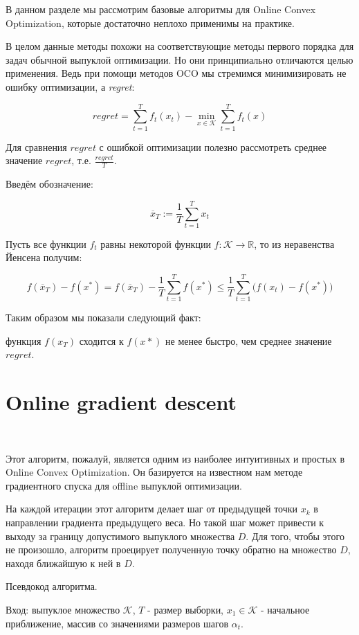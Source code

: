 \documentclass[12pt]{article}
\theoremstyle{definition}
\begin{document}
В данном разделе мы рассмотрим базовые алгоритмы для Online Convex Optimization, которые достаточно неплохо применимы на практике.

В целом данные методы похожи на соответствующие методы первого порядка для задач обычной выпуклой оптимизации. Но они принципиально отличаются целью применения. Ведь при помощи методов OCO мы стремимся минимизировать не ошибку оптимизации, а \textit{regret}:

$$regret = \sum\limits_{t=1}^T f_t(x_t) - \min\limits_{x \in \mathcal{K}} \sum\limits_{t=1}^T f_t(x)$$

Для сравнения $regret$ с ошибкой оптимизации полезно рассмотреть среднее значение $regret$, т.е. $\frac{regret}{T}$.

Введём обозначение:

$$\overline{x}_T := \frac{1}{T}\sum\limits_{t=1}^T x_t$$

Пусть все функции $f_t$ равны некоторой функции $f : \mathcal{K} \rightarrow \mathbb{R}$, то из неравенства Йенсена получим:

$$f(\overline{x}_T)-f(x^*) = f(\overline{x}_T)- \frac{1}{T} \sum\limits_{t=1}^T f(x^*) \leq \frac{1}{T}\sum\limits_{t=1}^T \big(f(x_t)-   f(x^*)\big	)$$

Таким образом мы показали следующий факт: 

функция $f(x_T)$ сходится к $f(x*)$ не менее быстро, чем среднее значение $regret$.

\section*{Online gradient descent}
$ $

Этот алгоритм, пожалуй, является одним из наиболее интуитивных и простых в Online Convex Optimization. Он базируется на известном нам методе градиентного спуска для offline выпуклой оптимизации.

На каждой итерации этот алгоритм делает шаг от предыдущей точки $x_k$ в направлении градиента предыдущего веса. Но такой шаг может привести к выходу за границу допустимого выпуклого множества $D$. Для того, чтобы этого не произошло, алгоритм проецирует полученную точку обратно на множество $D$, находя ближайшую к ней в $D$.

Псевдокод алгоритма.

Вход: выпуклое множество $\mathcal{K}$, $T$ - размер выборки, $x_1 \in \mathcal{K}$ - начальное приближение, массив со значениями размеров шагов $\alpha_t$.
\end{document}
